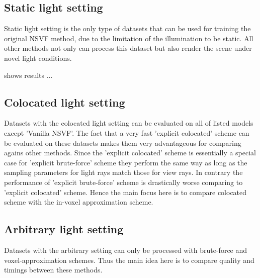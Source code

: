 \subsection{Static light setting}

Static light setting is the only type of datasets that can be used
for training the original NSVF method,
due to the limitation of the illumination to be static.
All other methods not only can process this dataset but also render the scene under novel light conditions.

 shows results ...




\subsection{Colocated light setting}


Datasets with the colocated light setting can be evaluated on all of listed models except 'Vanilla NSVF'.
The fact that a very fast 'explicit colocated' scheme can be evaluated on these datasets
makes them very advantageous for comparing agains other methods.
Since the 'explicit colocated' scheme is essentially a special case for 'explicit brute-force' scheme
they perform the same way as long as the sampling parameters for light rays match those for view rays.
In contrary the performance of 'explicit brute-force' scheme is drastically worse comparing to 'explicit colocated' scheme.
Hence the main focus here is to compare colocated scheme with the in-voxel approximation scheme.


\catchcolocmetrics

\catchcolocresults


\subsection{Arbitrary light setting}

Datasets with the arbitrary setting can only be processed with brute-force and voxel-approximation schemes.
Thus the main idea here is to compare quality and timings between these methods.

